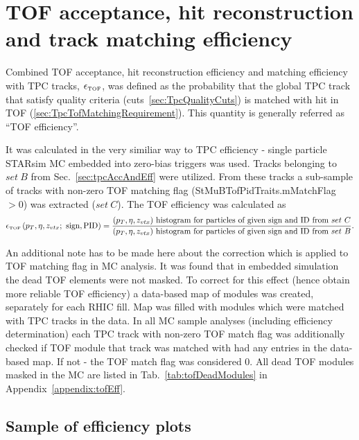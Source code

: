 \section{TOF acceptance, hit reconstruction and track matching efficiency}\label{sec:tofMatchEff}

Combined TOF acceptance, hit reconstruction efficiency and matching efficiency with TPC tracks, $\epsilon_{\textrm{\tiny TOF}}$, was defined as the probability that the global TPC track that satisfy quality criteria (cuts~\ref{sec:TpcQualityCuts}) is matched with hit in TOF (\ref{sec:TpcTofMatchingRequirement}). This quantity is generally referred as ``TOF efficiency''.

It was calculated in the very similiar way to TPC efficiency - single particle STARsim MC embedded into zero-bias triggers was used. Tracks belonging to $set~B$ from Sec.~\ref{sec:tpcAccAndEff} were utilized. From these tracks a sub-sample of tracks with non-zero TOF matching flag (StMuBTofPidTraits.mMatchFlag $>0$) was extracted ($set~C$). The TOF efficiency was calculated as
\begin{equation}\label{eq:tofAccAndEffDefinition}
		\epsilon_{\textrm{\tiny TOF}}\left(p_{T}, \eta, z_{vtx};~\textrm{sign},\textrm{PID}\right) = \frac{(p_{T},\eta, z_{vtx})~\textrm{histogram for particles of given sign and ID from}~set~C}{(p_{T},\eta, z_{vtx})~\textrm{histogram for particles of given sign and ID from}~set~B}.
	\end{equation}

An additional note has to be made here about the correction which is applied to TOF matching flag in MC analysis. It was found that in embedded simulation the dead TOF elements were not masked. To correct for this effect (hence obtain more reliable TOF efficiency) a data-based map of modules was created, separately for each RHIC fill. Map was filled with modules which were matched with TPC tracks in the data. In all MC sample analyses (including efficiency determination) each TPC track with non-zero TOF match flag was additionally checked if TOF module that track was matched with had any entries in the data-based map. If not - the TOF match flag was considered 0. All dead TOF modules masked in the MC are listed in Tab.~\ref{tab:tofDeadModules} in Appendix~\ref{appendix:tofEff}.

\subsection{Sample of  efficiency plots}

